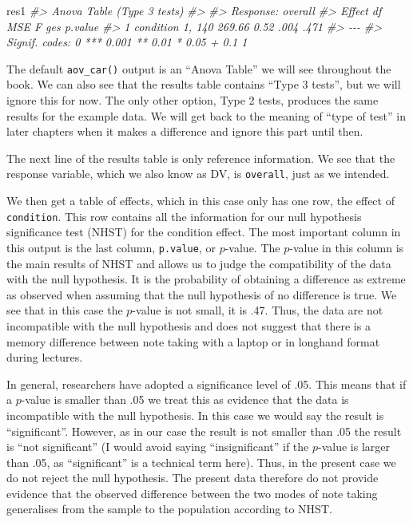 \documentclass[
]{book}
\newenvironment{Shaded}{\begin{snugshade}}{\end{snugshade}}
\newcommand{\CommentTok}[1]{\textcolor[rgb]{0.56,0.35,0.01}{\textit{#1}}}
\newcommand{\NormalTok}[1]{#1}
\begin{document}
\begin{Shaded}
\begin{Highlighting}[]
\NormalTok{res1}
\CommentTok{\#\textgreater{} Anova Table (Type 3 tests)}
\CommentTok{\#\textgreater{} }
\CommentTok{\#\textgreater{} Response: overall}
\CommentTok{\#\textgreater{}      Effect     df    MSE    F  ges p.value}
\CommentTok{\#\textgreater{} 1 condition 1, 140 269.66 0.52 .004    .471}
\CommentTok{\#\textgreater{} {-}{-}{-}}
\CommentTok{\#\textgreater{} Signif. codes:  0 \textquotesingle{}***\textquotesingle{} 0.001 \textquotesingle{}**\textquotesingle{} 0.01 \textquotesingle{}*\textquotesingle{} 0.05 \textquotesingle{}+\textquotesingle{} 0.1 \textquotesingle{} \textquotesingle{} 1}
\end{Highlighting}
\end{Shaded}

The default \texttt{aov\_car()} output is an ``Anova Table'' we will see throughout the book. We can also see that the results table contains ``Type 3 tests'', but we will ignore this for now. The only other option, Type 2 tests, produces the same results for the example data. We will get back to the meaning of ``type of test'' in later chapters when it makes a difference and ignore this part until then.

The next line of the results table is only reference information. We see that the response variable, which we also know as DV, is \texttt{overall}, just as we intended.

We then get a table of effects, which in this case only has one row, the effect of \texttt{condition}. This row contains all the information for our null hypothesis significance test (NHST) for the condition effect. The most important column in this output is the last column, \texttt{p.value}, or \(p\)-value. The \(p\)-value in this column is the main results of NHST and allows us to judge the compatibility of the data with the null hypothesis. It is the probability of obtaining a difference as extreme as observed when assuming that the null hypothesis of no difference is true. We see that in this case the \(p\)-value is not small, it is .47. Thus, the data are not incompatible with the null hypothesis and does not suggest that there is a memory difference between note taking with a laptop or in longhand format during lectures.

In general, researchers have adopted a significance level of .05. This means that if a \(p\)-value is smaller than .05 we treat this as evidence that the data is incompatible with the null hypothesis. In this case we would say the result is ``significant''. However, as in our case the result is not smaller than .05 the result is ``not significant'' (I would avoid saying ``insignificant'' if the \(p\)-value is larger than .05, as ``significant'' is a technical term here). Thus, in the present case we do not reject the null hypothesis. The present data therefore do not provide evidence that the observed difference between the two modes of note taking generalises from the sample to the population according to NHST.
\end{document}

